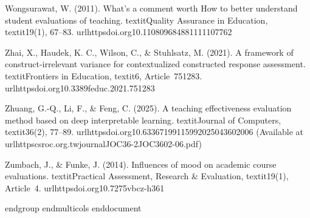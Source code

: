 Wongsurawat, W. (2011). What’s a comment worth How to better understand student evaluations of teaching. textit{Quality Assurance in Education}, textit{19}(1), 67--83. url{httpsdoi.org10.110809684881111107762}

Zhai, X., Haudek, K. C., Wilson, C., & Stuhlsatz, M. (2021). A framework of construct-irrelevant variance for contextualized constructed response assessment. textit{Frontiers in Education}, textit{6}, Article~751283. url{httpsdoi.org10.3389feduc.2021.751283}

Zhuang, G.-Q., Li, F., & Feng, C. (2025). A teaching effectiveness evaluation method based on deep interpretable learning. textit{Journal of Computers}, textit{36}(2), 77--89. url{httpsdoi.org10.63367199115992025043602006} (Available at url{httpscsroc.org.twjournalJOC36-2JOC3602-06.pdf})

Zumbach, J., & Funke, J. (2014). Influences of mood on academic course evaluations. textit{Practical Assessment, Research & Evaluation}, textit{19}(1), Article~4. url{httpsdoi.org10.7275vbcz-h361}

endgroup
end{multicols}
end{document}